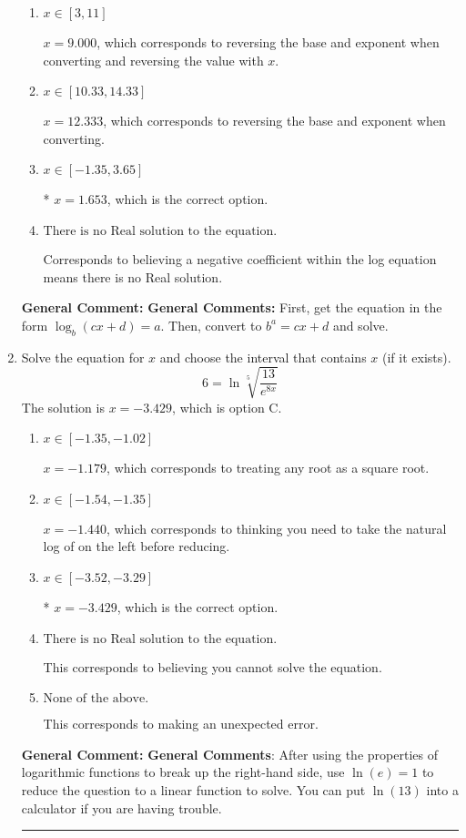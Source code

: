 \documentclass{extbook}[14pt]
\newcommand{\litem}[1]{\item #1

\rule{\textwidth}{0.4pt}}
\begin{document}
\begin{enumerate}
{\begin{enumerate}[label=\Alph*.]
$x = -6.667$, which corresponds to ignoring the vertical shift when converting to exponential form.
\item \( x \in [3, 11] \)

$x = 9.000$, which corresponds to reversing the base and exponent when converting and reversing the value with $x$.
\item \( x \in [10.33, 14.33] \)

$x = 12.333$, which corresponds to reversing the base and exponent when converting.
\item \( x \in [-1.35, 3.65] \)

* $x = 1.653$, which is the correct option.
\item \( \text{There is no Real solution to the equation.} \)

Corresponds to believing a negative coefficient within the log equation means there is no Real solution.
\end{enumerate}

\textbf{General Comment:} \textbf{General Comments:} First, get the equation in the form $\log_b{(cx+d)} = a$. Then, convert to $b^a = cx+d$ and solve.
}
\litem{
 Solve the equation for $x$ and choose the interval that contains $x$ (if it exists).
\[  6 = \ln{\sqrt[5]{\frac{13}{e^{8x}}}} \]
The solution is \( x = -3.429 \), which is option C.\begin{enumerate}[label=\Alph*.]
\item \( x \in [-1.35, -1.02] \)

$x = -1.179$, which corresponds to treating any root as a square root.
\item \( x \in [-1.54, -1.35] \)

$x = -1.440$, which corresponds to thinking you need to take the natural log of on the left before reducing.
\item \( x \in [-3.52, -3.29] \)

* $x = -3.429$, which is the correct option.
\item \( \text{There is no Real solution to the equation.} \)

This corresponds to believing you cannot solve the equation.
\item \( \text{None of the above.} \)

This corresponds to making an unexpected error.
\end{enumerate}

\textbf{General Comment:} \textbf{General Comments}: After using the properties of logarithmic functions to break up the right-hand side, use $\ln(e) = 1$ to reduce the question to a linear function to solve. You can put $\ln(13)$ into a calculator if you are having trouble.
}
\end{enumerate}
\end{document}
